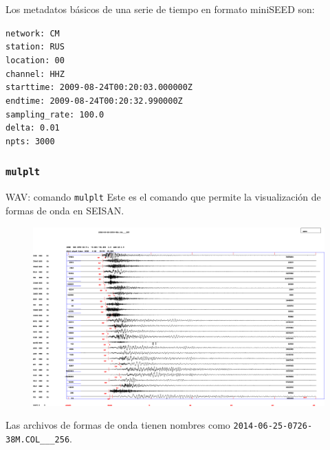 \documentclass[11pt]{beamer}
\begin{document}
\begin{frame}
Los metadatos básicos de una serie de tiempo en formato miniSEED son:
\begin{center}
{\tt       network: CM\\
         station: RUS\\
        location: 00\\
         channel: HHZ\\
       starttime: 2009-08-24T00:20:03.000000Z\\
         endtime: 2009-08-24T00:20:32.990000Z\\
   sampling\_rate: 100.0\\
              delta: 0.01\\
            npts: 3000\\}
\end{center}
\end{frame}


\subsubsection{{\tt mulplt}}
\begin{frame}{WAV: comando {\tt mulplt}}
Este es el comando que permite la visualización de formas de onda en SEISAN.
\begin{figure}
\includegraphics[scale=0.13]{TRAZA.png}
\end{figure}

Las archivos de formas de onda tienen nombres como {\tt 2014-06-25-0726-38M.COL\_\_\_256}.
\end{frame}
\end{document}
